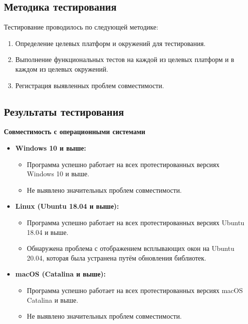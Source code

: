 \documentclass{article}
\begin{document}
    \subsection{Методика тестирования}

    Тестирование проводилось по следующей методике:

    \begin{enumerate}
        \item Определение целевых платформ и окружений для тестирования.
        \item Выполнение функциональных тестов на каждой из целевых платформ и в каждом из целевых окружений.
        \item Регистрация выявленных проблем совместимости.
    \end{enumerate}

    \subsection{Результаты тестирования}

    \textbf{Совместимость с операционными системами}

    \begin{itemize}
        \item \textbf{Windows 10 и выше:}
        \begin{itemize}
            \item Программа успешно работает на всех протестированных версиях Windows 10 и выше.
            \item Не выявлено значительных проблем совместимости.
        \end{itemize}
        \item \textbf{Linux (Ubuntu 18.04 и выше):}
        \begin{itemize}
            \item Программа успешно работает на всех протестированных версиях Ubuntu 18.04 и выше.
            \item Обнаружена проблема с отображением всплывающих окон на Ubuntu 20.04, которая была устранена путём обновления библиотек.
        \end{itemize}
        \item \textbf{macOS (Catalina и выше):}
        \begin{itemize}
            \item Программа успешно работает на всех протестированных версиях macOS Catalina и выше.
            \item Не выявлено значительных проблем совместимости.
        \end{itemize}
    \end{itemize}
\end{document}
